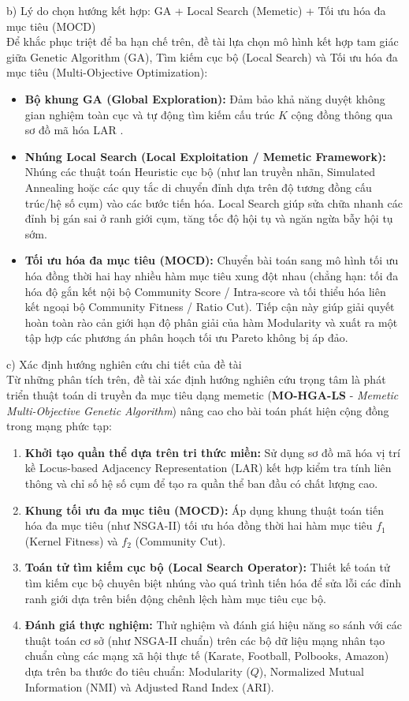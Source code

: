 \documentclass[14pt,a4paper]{extarticle}
\begin{document}
\noindent b) Lý do chọn hướng kết hợp: GA + Local Search (Memetic) + Tối ưu hóa đa mục tiêu (MOCD)
\\ \indent
Để khắc phục triệt để ba hạn chế trên, đề tài lựa chọn mô hình kết hợp tam giác giữa Genetic Algorithm (GA), Tìm kiếm cục bộ (Local Search) và Tối ưu hóa đa mục tiêu (Multi-Objective Optimization):
\begin{itemize}
    \item \textbf{Bộ khung GA (Global Exploration):} Đảm bảo khả năng duyệt không gian nghiệm toàn cục và tự động tìm kiếm cấu trúc $K$ cộng đồng thông qua sơ đồ mã hóa LAR \cite{Said2018}.
    \item \textbf{Nhúng Local Search (Local Exploitation / Memetic Framework):} Nhúng các thuật toán Heuristic cục bộ (như lan truyền nhãn, Simulated Annealing hoặc các quy tắc di chuyển đỉnh dựa trên độ tương đồng cấu trúc/hệ số cụm) vào các bước tiến hóa. Local Search giúp sửa chữa nhanh các đỉnh bị gán sai ở ranh giới cụm, tăng tốc độ hội tụ và ngăn ngừa bẫy hội tụ sớm.
    \item \textbf{Tối ưu hóa đa mục tiêu (MOCD):} Chuyển bài toán sang mô hình tối ưu hóa đồng thời hai hay nhiều hàm mục tiêu xung đột nhau (chẳng hạn: tối đa hóa độ gắn kết nội bộ Community Score / Intra-score và tối thiểu hóa liên kết ngoại bộ Community Fitness / Ratio Cut). Tiếp cận này giúp giải quyết hoàn toàn rào cản giới hạn độ phân giải của hàm Modularity và xuất ra một tập hợp các phương án phân hoạch tối ưu Pareto không bị áp đảo.
\end{itemize}

\noindent c) Xác định hướng nghiên cứu chi tiết của đề tài
\\ \indent
Từ những phân tích trên, đề tài xác định hướng nghiên cứu trọng tâm là phát triển thuật toán di truyền đa mục tiêu dạng memetic (\textbf{MO-HGA-LS} - \textit{Memetic Multi-Objective Genetic Algorithm}) nâng cao cho bài toán phát hiện cộng đồng trong mạng phức tạp:
\begin{enumerate}
\item \textbf{Khởi tạo quần thể dựa trên tri thức miền:} Sử dụng sơ đồ mã hóa vị trí kề Locus-based Adjacency Representation (LAR) kết hợp kiểm tra tính liên thông và chỉ số hệ số cụm để tạo ra quần thể ban đầu có chất lượng cao.
\item \textbf{Khung tối ưu đa mục tiêu (MOCD):} Áp dụng khung thuật toán tiến hóa đa mục tiêu (như NSGA-II) tối ưu hóa đồng thời hai hàm mục tiêu $f_1$ (Kernel Fitness) và $f_2$ (Community Cut).
\item \textbf{Toán tử tìm kiếm cục bộ (Local Search Operator):} Thiết kế toán tử tìm kiếm cục bộ chuyên biệt nhúng vào quá trình tiến hóa để sửa lỗi các đỉnh ranh giới dựa trên biến động chênh lệch hàm mục tiêu cục bộ.
\item \textbf{Đánh giá thực nghiệm:} Thử nghiệm và đánh giá hiệu năng so sánh với các thuật toán cơ sở (như NSGA-II chuẩn) trên các bộ dữ liệu mạng nhân tạo chuẩn cùng các mạng xã hội thực tế (Karate, Football, Polbooks, Amazon) dựa trên ba thước đo tiêu chuẩn: Modularity ($Q$), Normalized Mutual Information (NMI) và Adjusted Rand Index (ARI).
\end{enumerate}
\end{document}
